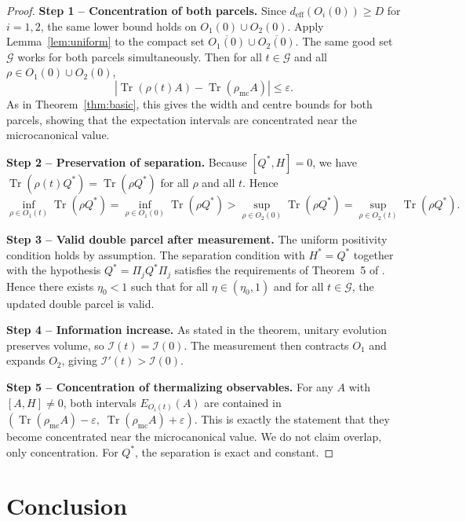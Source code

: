 \documentclass[11pt, onecolumn]{article}
\begin{document}
\begin{proof}
\textbf{Step 1 -- Concentration of both parcels.}  Since \(d_{\mathrm{eff}}(O_i(0))\ge D\) for \(i=1,2\), the same lower
bound holds on \(O_1(0)\cup O_2(0)\).
Apply Lemma~\ref{lem:uniform} to the compact set \(\overline{O_1(0)}\cup\overline{O_2(0)}\). The same good set \(\mathcal{G}\) works for both parcels simultaneously. Then for all \(t\in\mathcal{G}\) and all \(\rho\in O_1(0)\cup O_2(0)\),
\[
|\operatorname{Tr}(\rho(t)A)-\operatorname{Tr}(\rho_{\mathrm{mc}}A)|\le \varepsilon.
\]
As in Theorem~\ref{thm:basic}, this gives the width and centre bounds for both parcels, showing that the expectation intervals are concentrated near the microcanonical value.

\textbf{Step 2 -- Preservation of separation.}  
Because \([Q^*,H]=0\), we have \(\operatorname{Tr}(\rho(t)Q^*) = \operatorname{Tr}(\rho Q^*)\) for all \(\rho\) and all \(t\). Hence
\[
\inf_{\rho\in O_1(t)}\operatorname{Tr}(\rho Q^*) = \inf_{\rho\in O_1(0)}\operatorname{Tr}(\rho Q^*) > \sup_{\rho\in O_2(0)}\operatorname{Tr}(\rho Q^*) = \sup_{\rho\in O_2(t)}\operatorname{Tr}(\rho Q^*).
\]

\textbf{Step 3 -- Valid double parcel after measurement.}  
The uniform positivity condition holds by assumption. The separation condition with \(H^* = Q^*\) together with the hypothesis \(Q^* = \Pi_j Q^* \Pi_j\) satisfies the requirements of Theorem~5 of \cite{Edalat2026}. Hence there exists \(\eta_0<1\) such that for all \(\eta\in(\eta_0,1)\) and for all \(t\in\mathcal{G}\), the updated double parcel is valid.

\textbf{Step 4 -- Information increase.}  
As stated in the theorem, unitary evolution preserves volume, so \(\mathcal{I}(t)=\mathcal{I}(0)\). The measurement then contracts \(O_1\) and expands \(O_2\), giving \(\mathcal{I}'(t)>\mathcal{I}(0)\).

\textbf{Step 5 -- Concentration of thermalizing observables.}  
For any \(A\) with \([A,H]\neq 0\), both intervals \(E_{O_i(t)}(A)\) are contained in \((\operatorname{Tr}(\rho_{\mathrm{mc}}A)-\varepsilon,\; \operatorname{Tr}(\rho_{\mathrm{mc}}A)+\varepsilon)\). This is exactly the statement that they become concentrated near the microcanonical value. We do not claim overlap, only concentration. For \(Q^*\), the separation is exact and constant. 
\end{proof}

\section{Conclusion}
\end{document}
